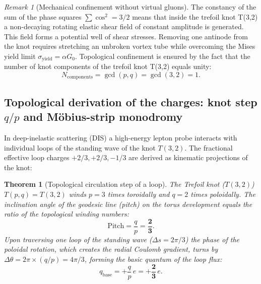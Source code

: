 \documentclass[11pt,a4paper]{article}
\newtheorem{theorem}{Theorem}
\theoremstyle{definition}
\theoremstyle{remark}
\newtheorem{remark}{Remark}
\begin{document}
\begin{remark}[Mechanical confinement without virtual gluons]
The constancy of the sum of the phase squares $\sum \cos^2 = 3/2$ means that inside the trefoil knot T(3,2) a non-decaying rotating elastic shear field of constant amplitude is generated. This field forms a potential well of shear stresses. Removing one antinode from the knot requires stretching an unbroken vortex tube while overcoming the Mises yield limit $\sigma_{\mathrm{yield}} = \alpha G_0$. Topological confinement is ensured by the fact that the number of knot components of the trefoil knot T(3,2) equals unity:
\begin{equation}
	N_{\mathrm{components}} = \gcd(p, q) = \gcd(3, 2) = 1.
	\label{eq:gcd_confinement_condition}
\end{equation}
\end{remark}

\subsection{Topological derivation of the charges: knot step $q/p$ and Möbius-strip monodromy}

In deep-inelastic scattering (DIS) a high-energy lepton probe interacts with individual loops of the standing wave of the knot $T(3,2)$. The fractional effective loop charges $+2/3, +2/3, -1/3$ are derived as kinematic projections of the knot:

\begin{theorem}[Topological circulation step of a loop]
\label{thm:quark_charges_derivation}
The Trefoil knot ($T(3,2)$) $T(p,q) = T(3,2)$ winds $p=3$ times toroidally and $q=2$ times poloidally. The inclination angle of the geodesic line (pitch) on the torus development equals the ratio of the topological winding numbers:
\begin{equation}
    \text{Pitch} = \frac{q}{p} = \frac{\mathbf{2}}{\mathbf{3}}.
    \label{eq:knot_pitch_two_thirds}
\end{equation}
Upon traversing one loop of the standing wave ($\Delta s = 2\pi/3$) the phase of the poloidal rotation, which creates the radial Coulomb gradient, turns by $\Delta\theta = 2\pi \times (q/p) = 4\pi/3$, forming the basic quantum of the loop flux:
\begin{equation}
    q_{\mathrm{base}} = +\frac{q}{p} \, e = +\frac{\mathbf{2}}{\mathbf{3}} \, e.
\end{equation}
\end{theorem}
\end{document}
